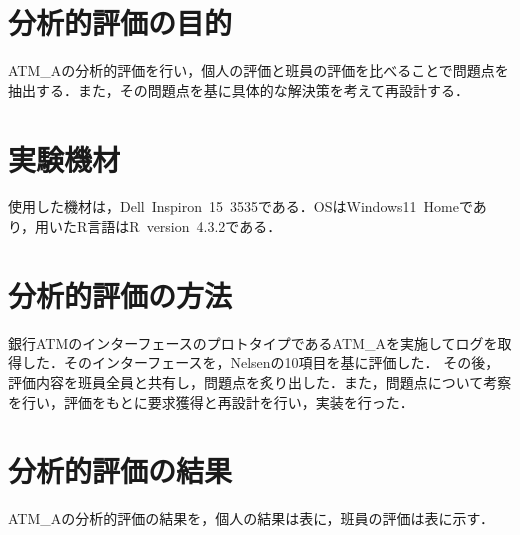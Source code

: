 \documentclass{jlreq}
\numberwithin{equation}{section}
\begin{document}
\tableofcontents
\clearpage

\section{分析的評価の目的}
ATM\_Aの分析的評価を行い，個人の評価と班員の評価を比べることで問題点を抽出する．また，その問題点を基に具体的な解決策を考えて再設計する．

\section{実験機材}
使用した機材は，Dell\ Inspiron\ 15\ 3535である．OSはWindows11\ Homeであり，用いたR言語はR\ version\ 4.3.2である．

\section{分析的評価の方法}
銀行ATMのインターフェースのプロトタイプであるATM\_Aを実施してログを取得した．そのインターフェースを，Nelsenの10項目を基に評価した．
その後，評価内容を班員全員と共有し，問題点を炙り出した．また，問題点について考察を行い，評価をもとに要求獲得と再設計を行い，実装を行った．

\section{分析的評価の結果}
ATM\_Aの分析的評価の結果を，個人の結果は表に，班員の評価は表に示す．
\end{document}
